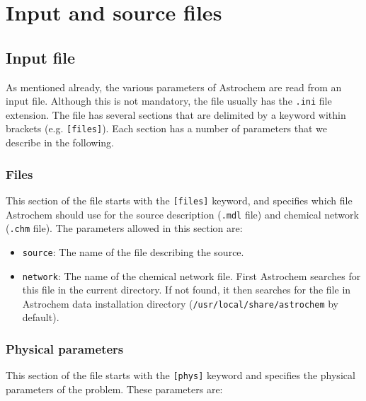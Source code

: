 \documentclass[a4paper,12pt]{article}
\begin{document}
\section{Input and source files}
\label{sec:input-source-files}

\subsection{Input file}
\label{sec:input-file}

As mentioned already, the various parameters of Astrochem are read
from an input file. Although this is not mandatory, the file usually
has the \verb=.ini= file extension. The file has several sections that
are delimited by a keyword within brackets (e.g. \verb=[files]=). Each
section has a number of parameters that we describe in the following.

\subsubsection{Files}
\label{sec:files}

This section of the file starts with the \verb=[files]= keyword, and
specifies which file Astrochem should use for the source description
(\verb=.mdl= file) and chemical network (\verb=.chm= file). The
parameters allowed in this section are:

\begin{itemize}

\item \verb=source=: The name of the file describing the source.

\item \verb=network=: The name of the chemical network file. First
  Astrochem searches for this file in the current directory. If not
  found, it then searches for the file in Astrochem data installation
  directory (\verb=/usr/local/share/astrochem= by default).

\end{itemize}

\subsubsection{Physical parameters}
\label{sec:physical-parameters}

This section of the file starts with the \verb=[phys]= keyword and
specifies the physical parameters of the problem. These parameters
are:
\end{document}
